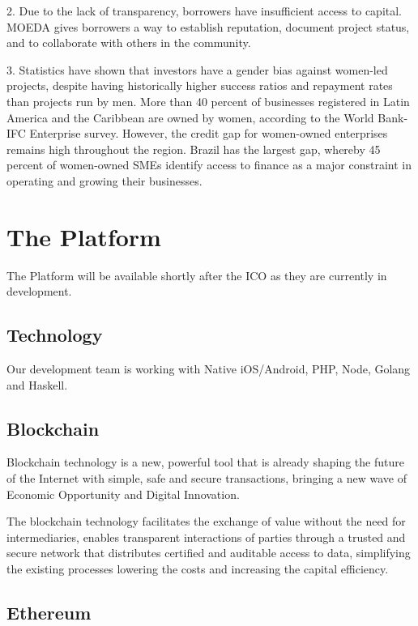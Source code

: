 \documentclass{article}
\begin{document}
2. Due to the lack of transparency, borrowers have insufficient access to capital. MOEDA gives borrowers a way to establish reputation, document project status, and to collaborate with others in the community.

3. Statistics have shown that investors have a gender bias against women-led projects, despite having historically higher success ratios and repayment rates than projects run by men. More than 40 percent of businesses registered in Latin America and the Caribbean are owned by women, according to the World Bank-IFC Enterprise survey. However, the credit gap for women-owned enterprises remains high throughout the region. Brazil has the largest gap, whereby 45 percent of women-owned SMEs identify access to finance as a major constraint in operating and growing their businesses.


\section {The Platform}

The Platform will be available shortly after the ICO as they are currently in development. 

\subsection {Technology}

Our development team is working with Native iOS/Android, PHP, Node, Golang and Haskell.


\subsection{Blockchain}

Blockchain technology is a new, powerful tool that is already shaping the future of the Internet with simple, safe and secure transactions, bringing a new wave of Economic Opportunity and Digital Innovation.

The blockchain technology facilitates the exchange of value without the need for intermediaries, enables transparent interactions of parties through a trusted and secure network that distributes certified and auditable access to data, simplifying the existing processes lowering the costs and increasing the capital efficiency.

\subsection{Ethereum}
\end{document}
